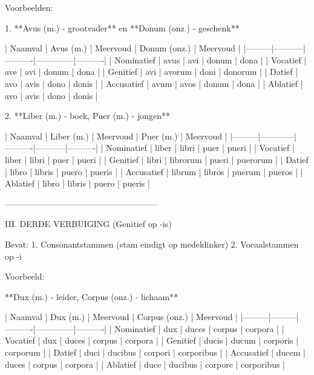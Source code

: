 \documentclass[a4paper,12pt]{book}
\begin{document}
Voorbeelden:

1. **Avus (m.) - grootvader** en **Donum (onz.) - geschenk**

| Naamval | Avus (m.)  | Meervoud | Donum (onz.) | Meervoud |
|---------|-----------|----------|--------------|----------|
| Nominatief  | avus  | avi      | donum       | dona     |
| Vocatief    | ave   | avi      | donum       | dona     |
| Genitief    | avi   | avorum   | doni        | donorum  |
| Datief      | avo   | avis     | dono        | donis    |
| Accusatief  | avum  | avos     | donum       | dona     |
| Ablatief    | avo   | avis     | dono        | donis    |

2. **Liber (m.) - boek, Puer (m.) - jongen**

| Naamval | Liber (m.)  | Meervoud | Puer (m.) | Meervoud |
|---------|------------|----------|-----------|----------|
| Nominatief  | liber   | libri    | puer      | pueri    |
| Vocatief    | liber   | libri    | puer      | pueri    |
| Genitief    | libri   | librorum | pueri     | puerorum |
| Datief      | libro   | libris   | puero     | pueris   |
| Accusatief  | librum  | libros   | puerum    | pueros   |
| Ablatief    | libro   | libris   | puero     | pueris   |

------------------------------------------------------

III. DERDE VERBUIGING (Genitief op -is)

Bevat:
1. Consonantstammen (stam eindigt op medeklinker)
2. Vocaalstammen op -i

Voorbeeld:

**Dux (m.) - leider, Corpus (onz.) - lichaam**

| Naamval | Dux (m.) | Meervoud | Corpus (onz.) | Meervoud |
|---------|---------|----------|--------------|----------|
| Nominatief  | dux  | duces    | corpus       | corpora  |
| Vocatief    | dux  | duces    | corpus       | corpora  |
| Genitief    | ducis | ducum   | corporis     | corporum |
| Datief      | duci  | ducibus | corpori      | corporibus |
| Accusatief  | ducem | duces   | corpus       | corpora  |
| Ablatief    | duce  | ducibus | corpore      | corporibus |
\end{document}

